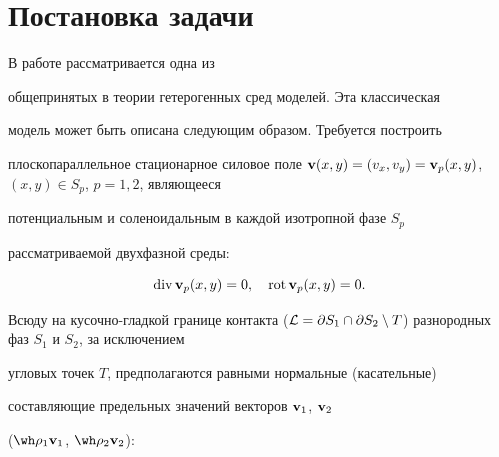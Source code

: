 \date{}




\pagestyle{plain} %







\maketitle


\label{begin}








\section{Постановка задачи}





В работе рассматривается одна из


общепринятых в теории гетерогенных сред моделей. Эта классическая


модель может быть описана следующим образом. Требуется построить


плоскопараллельное стационарное силовое поле ${\bold v}(x,y) =


(v_x,v_y) = {\bold v}_p(x,y)$, $(x,y)\in S_p$, $p=1,2$, являющееся


потенциальным и соленоидальным в каждой изотропной фазе $S_p$


рассматриваемой двухфазной среды:


\begin{equation} 


\Div {\bold v}_{p}(x,y)=0,\quad \Rot {\bold


v}_{p}(x,y)=0. \label{eq:1}


\end{equation}


Всюду на кусочно-гладкой границе контакта (${\cal L}=\partial S_1\cap


\partial S_2\setminus T$) разнородных фаз $S_1$ и $S_2$, за исключением


угловых точек $T$, предполагаются равными нормальные (касательные)


составляющие предельных значений векторов ${\bold v}_1$, ${\bold v}_2$


($\wh\rho_1{\bold v}_1$, $\wh\rho_2{\bold v}_2$):


